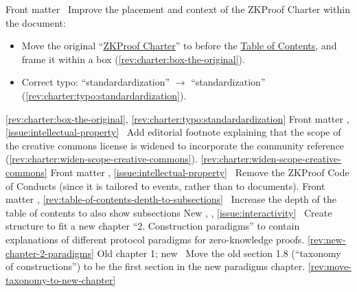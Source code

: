 \rowendL
Front matter
\newcol 
\newcol {}
\newcol \Chan\ Improve the placement and context of the ZKProof Charter within the document:
				\begin{itemize}
				\item Move the original ``\hyperref[sec:prelim:charter]{ZKProof Charter}'' to before the \hyperref[prelim:contents]{Table of Contents}, and frame it within a box (\ref{rev:charter:box-the-original}).
				\item Correct typo: ``standardardization'' $\rightarrow$ ``standardization'' (\ref{rev:charter:typo:standardardization}).
				\end{itemize}
\newcol \ref{rev:charter:box-the-original}, \ref{rev:charter:typo:standardardization}
\rowendL
Front matter
\newcol 
\newcol {}, \ref{issue:intellectual-property}
\newcol \Chan\ Add editorial footnote explaining that the scope of the creative commons license is widened to incorporate the community reference (\ref{rev:charter:widen-scope-creative-commons}).
\newcol \ref{rev:charter:widen-scope-creative-commons}
\rowendL
Front matter
\newcol 
\newcol {}, \ref{issue:intellectual-property}
\newcol \Chan\ Remove the ZKProof Code of Conducts (since it is tailored to events, rather than to documents).
\newcol 
\rowendL
Front matter
\newcol 
\newcol {}, \ref{rev:table-of-contents-depth-to-subsections}
\newcol \Chan\ Increase the depth of the table of contents to also show subsections
\newcol 
\rowendL
New 
\newcol 
\newcol {}, , \ref{issue:interactivity}
\newcol \Chan\ Create structure to fit a new chapter ``2. Construction paradigms'' to contain explanations 
	of different protocol paradigms for zero-knowledge proofs. 
\newcol \ref{rev:new-chapter-2-paradigms}
\rowendL
Old chapter 1; new 
\newcol 
\newcol {}
\newcol \Chan\ Move the old section 1.8 (``taxonomy of constructions'') 
	to be the first section in the new paradigms chapter.
\newcol \ref{rev:move-taxonomy-to-new-chapter}
